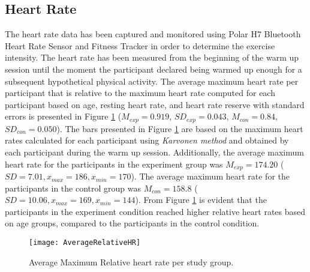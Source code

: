 \subsection{Heart Rate}
The heart rate data has been captured and monitored using Polar H7 Bluetooth Heart Rate Sensor and Fitness Tracker in order to determine the exercise intensity. The heart rate has been measured from the beginning of the warm up session until the moment the participant declared being warmed up enough for a subsequent hypothetical physical activity. The average maximum heart rate per participant that is relative to the maximum heart rate computed for each participant based on age, resting heart rate, and heart rate reserve with standard errors is presented in Figure \ref{fig:hrdata} (\begin{math}M_{exp}= 0.919 \end{math},	\begin{math} SD_{exp}= 0.043\end{math}, \begin{math}  M_{con}= 0.84\end{math},	\begin{math} SD_{con}= 0.050\end{math}). The bars presented in Figure \ref{fig:hrdata} are based on  the maximum heart rates calculated for each participant using \textit{Karvonen method}  \cite{tanaka2001age} and obtained by each participant during the warm up session. Additionally, the average maximum heart rate for the participants in the experiment group was \begin{math}M_{exp} = 174.20 \end{math} (\begin{math} SD= 7.01, x_{max}=186, x_{min}=170 \end{math}). The average maximum heart rate for the participants in the control group was \begin{math}M_{con} = 158.8 \end{math} (\begin{math} SD= 10.06, x_{max}= 169, x_{min}= 144\end{math}). From Figure \ref{fig:hrdata} is evident that the participants in the experiment condition reached higher relative heart rates based on age groups, compared to the participants in the control condition.\\ %
\begin{figure}[h]
    \centering
    \texttt{[image: AverageRelativeHR]}
    \caption{Average Maximum Relative heart rate per study group.}
    \label{fig:hrdata}
\end{figure}\\

